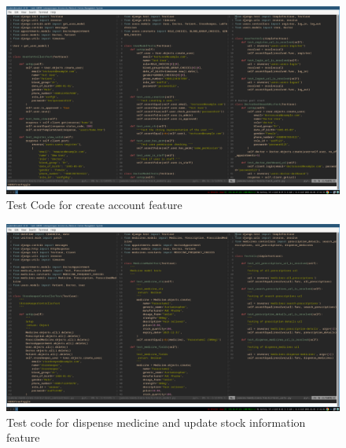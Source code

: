 \documentclass[a4paper,12pt]{article}
\begin{document}
\begin{figure}[H]
    \centering
    \includegraphics[width=1\textwidth]{images/TDD1.png}
    \caption{Test Code for create account feature}
    \label{fig:tdd1}
\end{figure}
\begin{figure}[H]
    \centering
    \includegraphics[width=1\textwidth]{images/TDD2.png}
    \caption{Test code for dispense medicine and update stock information feature}
    \label{fig:tdd2}
\end{figure}
\end{document}
